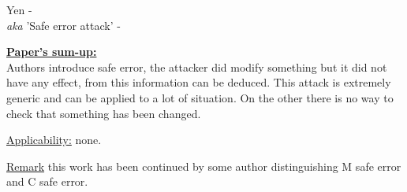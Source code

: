 \item Yen - \\
\textit{aka} 'Safe error attack' - 


\underline{\textbf{Paper's sum-up:}}\\
Authors introduce safe error, the attacker did modify something 
but it did not have any effect, from this information can be deduced. 
This attack is extremely generic and can be applied to a lot of situation. 
On the other there is no way to check that something has been changed.

\underline{Applicability:} none.

\underline{Remark}
this work has been continued by some author distinguishing
M safe error and C safe error.

